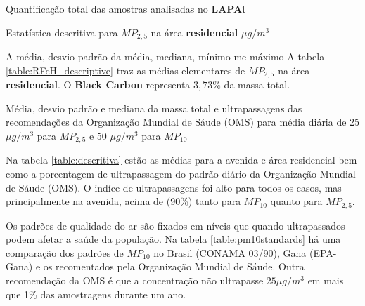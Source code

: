 \begin{table}[H]
  \centering
  \begin{scriptsize}
  
  \end{scriptsize}
  \caption{Quantificação total das amostras analisadas no \textbf{LAPAt}}
\end{table}

%    

\begin{table}[H]
  \centering
  \begin{scriptsize}
    
  \end{scriptsize}
  \caption{Estatística descritiva para $MP_{2,5}$ na área \textbf{residencial}
           $\mu g / m^3$ \label{table:RFcH_descriptive}}
\end{table}

A média, desvio padrão da média, mediana, mínimo me máximo
A tabela \ref{table:RFcH_descriptive} traz as médias elementares de $MP_{2,5}$ na área 
\textbf{residencial}.
O \textbf{Black Carbon} representa $3,73 \%$ da massa total.



Média, desvio padrão e mediana da massa total e ultrapassagens das 
           recomendações da Organização Mundial de Sáude (OMS) para média diária de 
           25 $\mu g/m^3$ para $MP_{2,5}$ e 50 $\mu g/m^3$ para $MP_{10}$


Na tabela \ref{table:descritiva} estão as médias para a avenida e área residencial
bem como a porcentagem de ultrapassagem do padrão diário da 
Organização Mundial de Sáude (OMS).
O indíce de ultrapassagens foi alto para todos os casos, mas principalmente na avenida,
acima de (90\%) tanto para $MP_{10}$ quanto para $MP_{2,5}$.

Os padrões de qualidade do ar são fixados em níveis que quando ultrapassados 
podem afetar a saúde da população. 
Na tabela \ref{table:pm10standards} há uma comparação dos padrões de $MP_{10}$ 
no Brasil (CONAMA 03/90), Gana (EPA-Gana) e os recomentados pela Organização
Mundial de Sáude.
Outra recomendação da OMS é que a concentração não ultrapasse $25 \mu g/m^3$ 
em mais que 1\% das amostragens durante um ano. 

